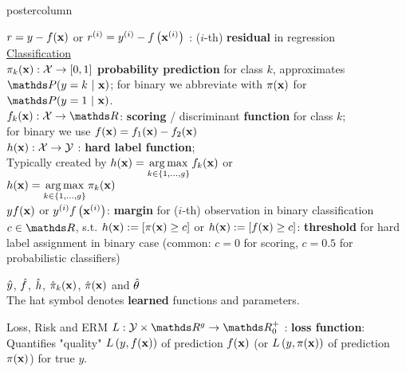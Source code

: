 \documentclass{beamer}
\begin{document}
\begin{frame}[fragile]{}
\begin{columns}
\begin{column}{.31\textwidth}
\begin{beamercolorbox}[center]{postercolumn}
\begin{minipage}{.98\textwidth}
{\begin{myblock}{}
$r = y - f(\mathbf{x})$ or $r^{(i)} = y^{(i)} - f\left(\mathbf{x}^{(i)}\right)$ : ($i$-th) \textbf{residual} in regression\\



\underline{Classification}\\

$\pi_{k}(\mathbf{x}) : \mathcal{X} \rightarrow [0,1]$ \textbf{probability prediction} for class $k$, approximates $\postk$;
for binary we abbreviate with $\pi(\mathbf{x})$ for $\post$.\\
 
$\fkx: \Xspace \rightarrow \R$: \textbf{scoring} / discriminant \textbf{function} for class $k$;\\
for binary we use $f(\mathbf{x}) = f_{1}(\mathbf{x}) - f_{2}(\mathbf{x})$\\
 
$h(\mathbf{x}): \mathcal{X} \rightarrow \mathcal{Y}$ : \textbf{hard label function};\\ 
Typically created by $h(\mathbf{x}) = \mathop{\mathrm{arg\,max}} \limits_{k \in \{1, \ldots, g\}} f_{k}(\mathbf{x})$ or \\ $h(\mathbf{x}) = \mathop{\mathrm{arg\,max}} \limits_{k \in \{1, \ldots, g\}} \pi_{k}(\mathbf{x})$  \\

$y f(\mathbf{x})$ or $y^{(i)} f\left(\mathbf{x}^{(i)}\right)$: \textbf{margin} for ($i$-th) observation in binary classification\\%

$c \in \R$, s.t. $h(\mathbf{x}) := [\pi(\mathbf{x}) \geq c]$ or $h(\mathbf{x}) := [f(\mathbf{x}) \geq c]$: \textbf{threshold} for hard label assignment in binary case (common: $c = 0$ for scoring, $c = 0.5$ for probabilistic classifiers)

\vspace{1cm}

$\hat{y}$, $\hat{f}$, $\hat{h}$, $\hat \pi_{k}(\mathbf{x})$, $\hat \pi(\mathbf{x})$ and $\hat{\theta}$ \\
The hat symbol denotes \textbf{learned} functions and parameters.

\end{myblock}

\begin{myblock}{Loss, Risk and ERM}
  $L: \Yspace \times \R^g \to \R^+_0$ : \textbf{loss function}: 
 Quantifies "quality" $L\left(y, f(\mathbf{x})\right)$ of prediction $f(\mathbf{x})$ (or $L\left(y, \pi(\mathbf{x})\right)$ of prediction $\pi(\mathbf{x})$) for true $y$. \\


\end{myblock}}
\end{minipage}
\end{beamercolorbox}
\end{column}
\end{columns}
\end{frame}
\end{document}
